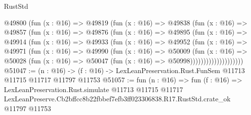 \begin{lexlean}{RustStd}
\begin{coremodule}
              @49800
                (fun (x : @16) =>
                @49819
                  (fun (x : @16) =>
                  @49838
                    (fun (x : @16) =>
                    @49857
                      (fun (x : @16) =>
                      @49876
                        (fun (x : @16) =>
                        @49895
                          (fun (x : @16) =>
                          @49914
                            (fun (x : @16) =>
                            @49933
                              (fun (x : @16) =>
                              @49952
                                (fun (x : @16) =>
                                @49971
                                  (fun (x : @16) =>
                                  @49990
                                    (fun (x : @16) =>
                                    @50009
                                      (fun (x : @16) =>
                                      @50028
                                        (fun (x : @16) =>
                                        @50047 (fun (x : @16) => @50998))))))))))))))))))))
@51047 := (n : @16) ->
  (f : @16) -> LexLeanPreservation.Rust.FunSem @11713 @11715 @11717 @11797 @11753
@51057 := fun (n : @16) =>
  fun (f : @16) =>
  LexLeanPreservation.Rust.simulate
    @11713
    @11715
    @11717
    LexLeanPreserve.Cb2bffcc8b22fbbef7efb3ff023306838.R17.RustStd.crate_ok
    @11797
    @11753
\end{coremodule}
\end{lexlean}
